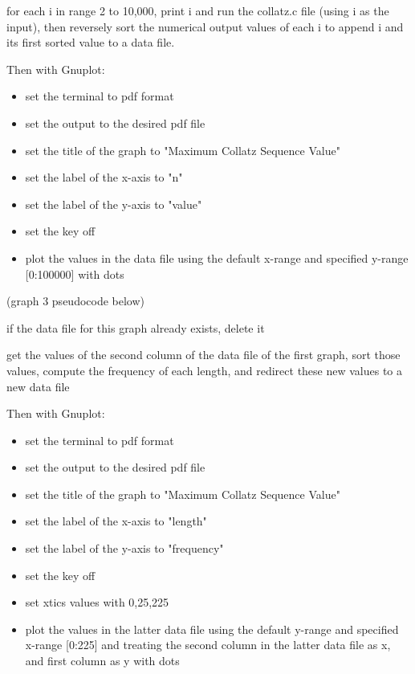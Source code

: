 \documentclass[11pt]{article}
\begin{document}
for each i in range 2 to 10,000, print i and run the collatz.c file
(using i as the input), then reversely sort the numerical output values of
each i to append i and its first sorted value to a data file.


Then with Gnuplot:

      
      \begin{itemize}
       \item set the terminal to pdf format
       \item set the output to the desired pdf file
       \item set the title of the graph to "Maximum Collatz Sequence Value"
       \item set the label of the x-axis to "n"        
       \item set the label of the y-axis to "value"
       \item set the key off
       \item plot the values in the data file using the default x-range and
	     specified y-range [0:100000] with dots
      \end{itemize}


(graph 3 pseudocode below)

if the data file for this graph already exists, delete it

get the values of the second column of the data file of the first graph,
sort those values, compute the frequency of each length, and redirect
these new values to a new data file

Then with Gnuplot:


      \begin{itemize}
       \item set the terminal to pdf format
       \item set the output to the desired pdf file
       \item set the title of the graph to "Maximum Collatz Sequence Value"
       \item set the label of the x-axis to "length"
       \item set the label of the y-axis to "frequency"
       \item set the key off
       \item set xtics values with 0,25,225
       \item plot the values in the latter data file using the default y-range and 
	     specified x-range [0:225] and treating the second column in the latter
	     data file as x, and first column as y with dots
      \end{itemize}
\end{document}
